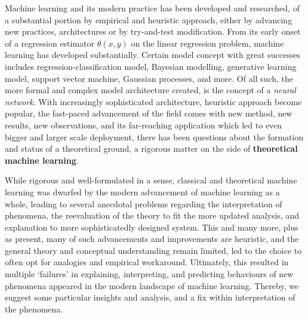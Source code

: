 \documentclass{article}
\begin{document}
Machine learning and its modern practice has been developed and researched, of a substantial portion by empirical and heuristic approach, either by advancing new practices, architectures or by try-and-test modification. From its early onset of a regression estimator $\theta(x,y)$ on the linear regression problem, machine learning has developed substantially. Certain model concept with great successes includes regression-classification model, Bayesian modelling, generative learning model, support vector machine, Gaussian processes, and more. Of all such, the more formal and complex model architecture created, is the concept of a \textit{neural network}. With increasingly sophisticated architecture, heuristic approach become popular, the fast-paced advancement of the field comes with new method, new results, new observations, and its far-reaching application which led to even bigger and larger scale deployment, there has been questions about the formation and status of a theoretical ground, a rigorous matter on the side of \textbf{theoretical machine learning}.

While rigorous and well-formulated in a sense, classical and theoretical machine learning was dwarfed by the modern advancement of machine learning as a whole, leading to several anecdotal problems regarding the interpretation of phenomena, the reevaluation of the theory to fit the more updated analysis, and explanation to more sophisticatedly designed system. This and many more, plus as present, many of such advancements and improvements are heuristic, and the general theory and conceptual understanding remain limited, led to the choice to often opt for analogies and empirical workaround. Ultimately, this resulted in multiple `failures' in explaining, interpreting, and predicting behaviours of new phenomena appeared in the modern landscape of machine learning. Thereby, we suggest some particular insights and analysis, and a fix within interpretation of the phenomena. 
\end{document}
